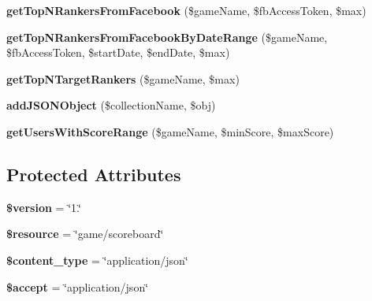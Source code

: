 \begin{DoxyCompactItemize}
\item 
\hypertarget{class_score_board_service_a83986af2a7966b96a93d361f2f00cf5a}{{\bfseries get\+Top\+N\+Rankers\+From\+Facebook} (\$game\+Name, \$fb\+Access\+Token, \$max)}\label{class_score_board_service_a83986af2a7966b96a93d361f2f00cf5a}

\item 
\hypertarget{class_score_board_service_a0bda0b03fd66202309c308491e69c770}{{\bfseries get\+Top\+N\+Rankers\+From\+Facebook\+By\+Date\+Range} (\$game\+Name, \$fb\+Access\+Token, \$start\+Date, \$end\+Date, \$max)}\label{class_score_board_service_a0bda0b03fd66202309c308491e69c770}

\item 
\hypertarget{class_score_board_service_ac4c81e49320391e02c79ad3bd69d15dd}{{\bfseries get\+Top\+N\+Target\+Rankers} (\$game\+Name, \$max)}\label{class_score_board_service_ac4c81e49320391e02c79ad3bd69d15dd}

\item 
\hypertarget{class_score_board_service_a5821bf72489c15b04e59a24c8beb4766}{{\bfseries add\+J\+S\+O\+N\+Object} (\$collection\+Name, \$obj)}\label{class_score_board_service_a5821bf72489c15b04e59a24c8beb4766}

\item 
\hypertarget{class_score_board_service_ae53051147c35a85f75e07bfa109bb1c6}{{\bfseries get\+Users\+With\+Score\+Range} (\$game\+Name, \$min\+Score, \$max\+Score)}\label{class_score_board_service_ae53051147c35a85f75e07bfa109bb1c6}

\end{DoxyCompactItemize}
\subsection*{Protected Attributes}
\begin{DoxyCompactItemize}
\item 
\hypertarget{class_score_board_service_a17c8948c68aa44fa9961ae169b6a8961}{{\bfseries \$version} = \char`\"{}1.\char`\"{}}\label{class_score_board_service_a17c8948c68aa44fa9961ae169b6a8961}

\item 
\hypertarget{class_score_board_service_abd4c7b8b084214b8d2533ba07fce6b83}{{\bfseries \$resource} = \char`\"{}game/scoreboard\char`\"{}}\label{class_score_board_service_abd4c7b8b084214b8d2533ba07fce6b83}

\item 
\hypertarget{class_score_board_service_ae754d6373f275e781f47c8bc9b994b6d}{{\bfseries \$content\+\_\+type} = \char`\"{}application/json\char`\"{}}\label{class_score_board_service_ae754d6373f275e781f47c8bc9b994b6d}

\item 
\hypertarget{class_score_board_service_a75fc18c4ff06288ff9fdf8aba9bd1081}{{\bfseries \$accept} = \char`\"{}application/json\char`\"{}}\label{class_score_board_service_a75fc18c4ff06288ff9fdf8aba9bd1081}

\end{DoxyCompactItemize}

